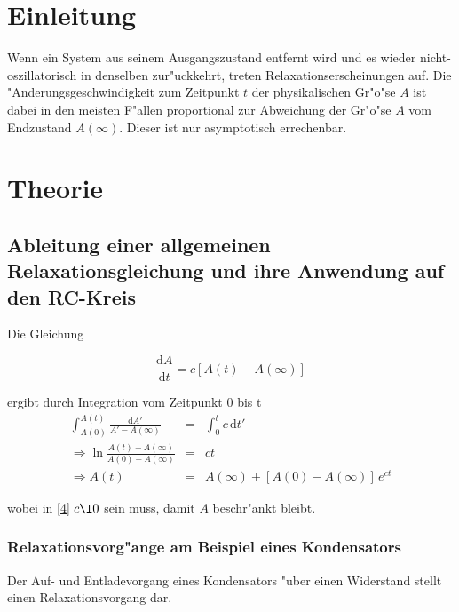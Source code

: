 \documentclass{scrartcl}
\begin{document}
	\section{Einleitung}

		Wenn ein System aus seinem Ausgangszustand entfernt wird und es wieder nicht-oszillatorisch in denselben zur"uckkehrt, treten Relaxationserscheinungen auf. Die "Anderungsgeschwindigkeit zum Zeitpunkt $t$ der physikalischen Gr"o"se $A$ ist dabei in den meisten F"allen proportional zur Abweichung der Gr"o"se $A$ vom Endzustand $A(\infty)$. Dieser ist nur asymptotisch errechenbar.
	
	\section{Theorie}

		\subsection{Ableitung einer allgemeinen Relaxationsgleichung und ihre Anwendung auf den RC-Kreis}

			Die Gleichung

			\begin{equation}
				\frac{\mathrm{d} A}{\mathrm{d} t} = c \left[ A(t) - A(\infty) \right] \label{1}
			\end{equation}

			ergibt durch Integration vom Zeitpunkt 0 bis t 
			\begin{eqnarray}
				\int_{A(0)}^{A(t)} \! \frac{\mathrm{d} A'}{A' - A(\infty)} &=& \int_0^t \! c \, \mathrm{d} t' \label{2}\\
				\Rightarrow \ln{\frac{A(t) - A(\infty)}{A(0) - A(\infty)}} &=& c t \label{3}\\
				\Rightarrow A(t) &=& A(\infty) + \left[ A(0) - A(\infty) \right] \, e^{c t} \label{4}
			\end{eqnarray}

			wobei in \ref{4} $c \l 0$ sein muss, damit $A$ beschr"ankt bleibt.

			\subsubsection{Relaxationsvorg"ange am Beispiel eines Kondensators}

				Der Auf- und Entladevorgang eines Kondensators "uber einen Widerstand stellt einen Relaxationsvorgang dar. \\[0.1cm]
\end{document}
